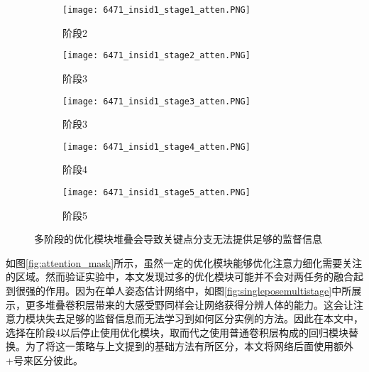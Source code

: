 \begin{figure}[ht]
	\centering
	\begin{subfigure}[b]{0.18\linewidth}
		\texttt{[image: 6471\_insid1\_stage1\_atten.PNG]}
		\caption{阶段2}
	\end{subfigure}
	\begin{subfigure}[b]{0.18\linewidth}
		\texttt{[image: 6471\_insid1\_stage2\_atten.PNG]}
		\caption{阶段3}
	\end{subfigure}
	\begin{subfigure}[b]{0.18\linewidth}
		\texttt{[image: 6471\_insid1\_stage3\_atten.PNG]}
		\caption{阶段3}
	\end{subfigure}
	\begin{subfigure}[b]{0.18\linewidth}
		\texttt{[image: 6471\_insid1\_stage4\_atten.PNG]}
		\caption{阶段4}
	\end{subfigure}
	\begin{subfigure}[b]{0.18\linewidth}
		\texttt{[image: 6471\_insid1\_stage5\_atten.PNG]}
		\caption{阶段5}
	\end{subfigure}
	\caption{多阶段的优化模块堆叠会导致关键点分支无法提供足够的监督信息}
	\label{fig:multistageattention}
\end{figure}

如图\ref{fig:attention_mask}所示，虽然一定的优化模块能够优化注意力细化需要关注的区域。然而验证实验中，本文发现过多的优化模块可能并不会对两任务的融合起到很强的作用。因为在单人姿态估计网络中，如图\ref{fig:singleposemultistage}中所展示，更多堆叠卷积层带来的大感受野同样会让网络获得分辨人体的能力。这会让注意力模块失去足够的监督信息而无法学习到如何区分实例的方法。因此在本文中，选择在阶段4以后停止使用优化模块，取而代之使用普通卷积层构成的回归模块替换。为了将这一策略与上文提到的基础方法有所区分，本文将网络后面使用额外+号来区分彼此。

